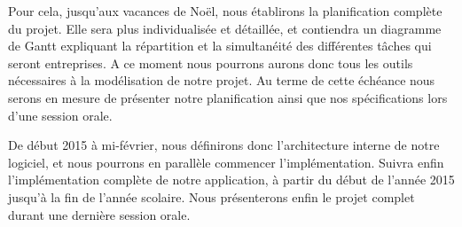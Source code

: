 		Pour cela, jusqu'aux vacances de Noël, nous établirons la planification complète du projet. Elle sera plus individualisée et détaillée, et contiendra un diagramme de Gantt expliquant la répartition et la simultanéité des différentes tâches qui seront entreprises.
		A ce moment nous pourrons aurons donc tous les outils nécessaires à la modélisation de notre projet.
		Au terme de cette échéance nous serons en mesure de présenter notre planification ainsi que nos spécifications lors d'une session orale.

		De début 2015 à mi-février, nous définirons donc l'architecture interne de notre logiciel, et nous pourrons en parallèle commencer l'implémentation.
		Suivra enfin l'implémentation complète de notre application, à partir du début de l'année 2015 jusqu'à la fin de l'année scolaire.
		Nous présenterons enfin le projet complet durant une dernière session orale.

	    
